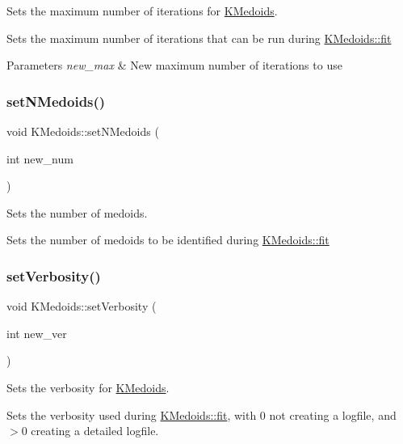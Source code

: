 Sets the maximum number of iterations for \hyperlink{classKMedoids}{K\+Medoids}. 

Sets the maximum number of iterations that can be run during \hyperlink{classKMedoids_ae241800e72a6b4a677333ffbf06e1798}{K\+Medoids\+::fit}


\begin{DoxyParams}{Parameters}
{\em new\+\_\+max} & New maximum number of iterations to use \\
\hline
\end{DoxyParams}
\mbox{\label{classKMedoids_ad28860f50c0b5a4968f99d103b3de06f}} 
\subsubsection{\texorpdfstring{set\+N\+Medoids()}{setNMedoids()}}
{\footnotesize\ttfamily void K\+Medoids\+::set\+N\+Medoids (\begin{DoxyParamCaption}\item[{int}]{new\+\_\+num }\end{DoxyParamCaption})}



Sets the number of medoids. 

Sets the number of medoids to be identified during \hyperlink{classKMedoids_ae241800e72a6b4a677333ffbf06e1798}{K\+Medoids\+::fit} \mbox{\label{classKMedoids_a8d03726bbd66ffc6d2c202d2a3cf40d5}} 
\subsubsection{\texorpdfstring{set\+Verbosity()}{setVerbosity()}}
{\footnotesize\ttfamily void K\+Medoids\+::set\+Verbosity (\begin{DoxyParamCaption}\item[{int}]{new\+\_\+ver }\end{DoxyParamCaption})}



Sets the verbosity for \hyperlink{classKMedoids}{K\+Medoids}. 

Sets the verbosity used during \hyperlink{classKMedoids_ae241800e72a6b4a677333ffbf06e1798}{K\+Medoids\+::fit}, with 0 not creating a logfile, and $>$0 creating a detailed logfile.


